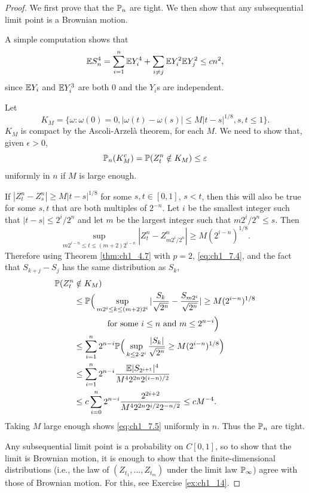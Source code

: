 \begin{proof}
We first prove that the $\P_n$ are tight. We then show that any subsequential limit point is a Brownian motion.

A simple computation shows that
\begin{equation}\label{eq:ch1_7.4}
    \E S_n^4 = \sum_{i=1}^n \E Y_i^4 + \sum_{i\neq j} \E Y_i^2 \E Y_j^2 \leq cn^2,
\end{equation}
since $\E Y_i$ and $\E Y_i^3$ are both 0 and the $Y_i$s are independent.

Let
\[
    K_M = \{\omega : \omega(0) = 0, |\omega(t) - \omega(s)| \leq M|t-s|^{1/8}, s,t \leq 1\}.
\]
$K_M$ is compact by the Ascoli-Arzel\`a theorem, for each $M$. We need to show that, given $\epsilon > 0$,
\begin{equation}\label{eq:ch1_7.5}
    \P_n(K_M^c) = \P(Z_t^n \notin K_M) \leq \epsilon
\end{equation}
uniformly in $n$ if $M$ is large enough.

If $|Z_t^n - Z_s^n| \geq M|t-s|^{1/8}$ for some $s,t \in [0,1]$, $s < t$, then this will also be true for some $s,t$ that are both multiples of $2^{-n}$. Let $i$ be the smallest integer such that $|t-s| \leq 2^i/2^n$ and let $m$ be the largest integer such that $m2^i/2^n \leq s$. Then
\[
    \sup_{m2^{i-n} \leq t \leq (m+2)2^{i-n}} |Z_t^n - Z_{m2^i/2^n}^n| \geq M(2^{i-n})^{1/8}.
\]
Therefore using Theorem \ref{thm:ch1_4.7} with $p=2$, \eqref{eq:ch1_7.4}, and the fact that $S_{k+j} - S_j$ has the same distribution as $S_k$,
\begin{align*}
    \P(Z_t^n &\notin K_M) \\
    &\leq \P\Big(\sup_{m2^i \leq k \leq (m+2)2^i} |\frac{S_k}{\sqrt{2^n}} - \frac{S_{m2^i}}{\sqrt{2^n}}| \geq M(2^{i-n})^{1/8} \\
    &\qquad\qquad\text{for some}~i \leq n~\text{and}~m \leq 2^{n-i}\Big) \\
    &\leq \sum_{i=1}^n 2^{n-i}\P\Big(\sup_{k \leq 2\cdot 2^i} \frac{|S_k|}{\sqrt{2^n}} \geq M(2^{i-n})^{1/8}\Big) \\
    &\leq \sum_{i=1}^n 2^{n-i} \frac{\E |S_{2^{i+1}}|^4}{M^4 2^{2n} 2^{(i-n)/2}} \\
    &\leq c\sum_{i=0}^n 2^{n-i} \frac{2^{2i+2}}{M^4 2^{2n} 2^{i/2} 2^{-n/2}} \leq cM^{-4}.
\end{align*}
Taking $M$ large enough shows \eqref{eq:ch1_7.5} uniformly in $n$. Thus the $\P_n$ are tight.

Any subsequential limit point is a probability on $C[0,1]$, so to show that the limit is Brownian motion, it is enough to show that the finite-dimensional distributions (i.e., the law of $(Z_{t_1},\ldots,Z_{t_m})$ under the limit law $\P_\infty$) agree with those of Brownian motion. For this, see Exercise \ref{ex:ch1_14}.
\end{proof}


